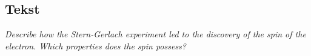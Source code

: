 \subsection{Tekst}

\emph{Describe how the Stern-Gerlach experiment led to the discovery of the spin of the electron. Which properties does the spin possess?}